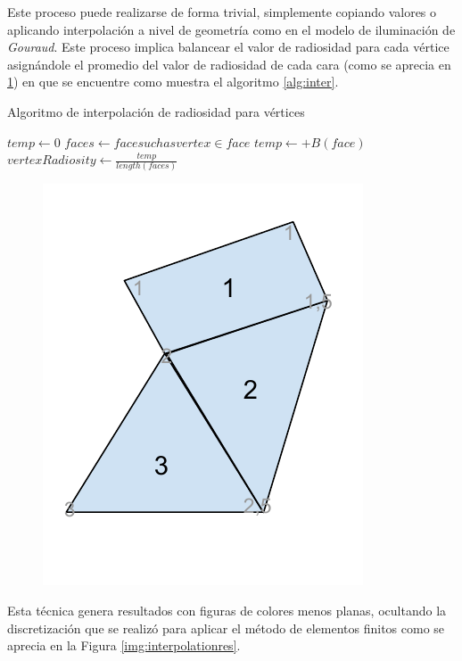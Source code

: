 Este proceso puede realizarse de forma trivial, simplemente copiando valores o aplicando interpolación a nivel de geometría como en el modelo de iluminación de \textit{Gouraud}. Este proceso implica balancear el valor de radiosidad para cada vértice asignándole el promedio del valor de radiosidad de cada cara (como se aprecia en \ref{img:interpolation}) en que se encuentre como muestra el algoritmo \ref{alg:inter}.

\begin{algorithm}
	\caption{Algoritmo de interpolación de radiosidad para vértices}
	\label{alg:inter}
	\begin{algorithmic}
				\State $temp \gets 0$
				\State $faces \gets {face such as vertex \in face}$
					\State $temp \gets +B(face)$
				\EndLoop
				\State $vertexRadiosity \gets \frac{temp}{length(faces)}$
			\EndLoop
		\EndFunction
	\end{algorithmic}
\end{algorithm}

\begin{figure}[H]
	\centering
	\includegraphics[width=.5\linewidth]{assets/Interpolation}
	\label{img:interpolation}
\end{figure}

Esta técnica genera resultados con figuras de colores menos planas, ocultando la discretización que se realizó para aplicar el método de elementos finitos como se aprecia en la Figura \ref{img:interpolationres}.


